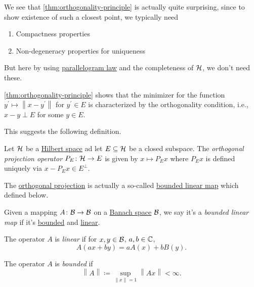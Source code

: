 We see that \autoref{thm:orthogonality-principle} is actually quite surprising, since to show existence of such a closest point, we typically need
\begin{enumerate}
	\item Compactness properties
	\item Non-degeneracy properties for uniqueness
\end{enumerate}
But here by using \hyperref[lma:parallelogram-law]{parallelogram law} and the completeness of \(\mathcal{\MakeUppercase{h}} \), we don't need these.

\begin{remark}
	\autoref{thm:orthogonality-principle} shows that the minimizer for the function \(y^\prime \mapsto \left\lVert x - y^\prime \right\rVert \) for \(y^\prime \in E\) is characterized by the orthogonality condition, i.e., \(x - y\perp E\) for some \(y\in E\).
\end{remark}

This suggests the following definition.

\begin{definition}\label{def:orthogonal-projection}
	Let \(\mathcal{\MakeUppercase{h}} \) be a \hyperref[def:Hilbert-space]{Hilbert space} ad let \(E\subseteq \mathcal{\MakeUppercase{h}} \) be a closed subspace. The \emph{orthogonal projection operator} \(P_E\colon \mathcal{\MakeUppercase{h}} \to E\) is given by \(x \mapsto P_E x\) where \(P_E x\) is defined uniquely via \(x - P_E x\in E^\perp\).
\end{definition}

The \hyperref[def:orthogonal-projection]{orthogonal projection} is actually a so-called \hyperref[def:bounded-linear-map]{bounded linear map} which defined below.

\begin{definition}\label{def:bounded-linear-map}
	Given a mapping \(A\colon \mathcal{\MakeUppercase{b}} \to \mathcal{\MakeUppercase{b}} \) on a \hyperref[def:Banach-space]{Banach space} \(\mathcal{\MakeUppercase{b}} \), we say it's a \emph{bounded linear map} if it's \hyperref[def:bounded-map]{bounded} and \hyperref[def:linear-map]{linear}.

	\begin{definition}\label{def:linear-map}
		The operator \(A\) is \emph{linear} if for \(x, y\in \mathcal{\MakeUppercase{b}} \), \(a, b\in \mathbb{\MakeUppercase{c}} \),
		\[
			A(ax + by) = a A(x) + b B(y).
		\]
	\end{definition}

	\begin{definition}\label{def:bounded-map}
		The operator \(A\) is \emph{bounded} if
		\[
			\left\lVert A\right\rVert \coloneqq \sup _{\left\lVert x\right\rVert = 1} \left\lVert Ax\right\rVert < \infty.
		\]
	\end{definition}
\end{definition}

